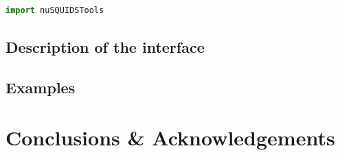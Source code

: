 \documentclass[3p,12pt]{elsarticle}
\begin{document}
\begin{lstlisting}[language=Python]
import nuSQUIDSTools
\end{lstlisting}


\subsection{Description of the interface}



\subsection{Examples}

\section{Conclusions \& Acknowledgements} 
\label{sec:conclu} 


%

\end{document}
